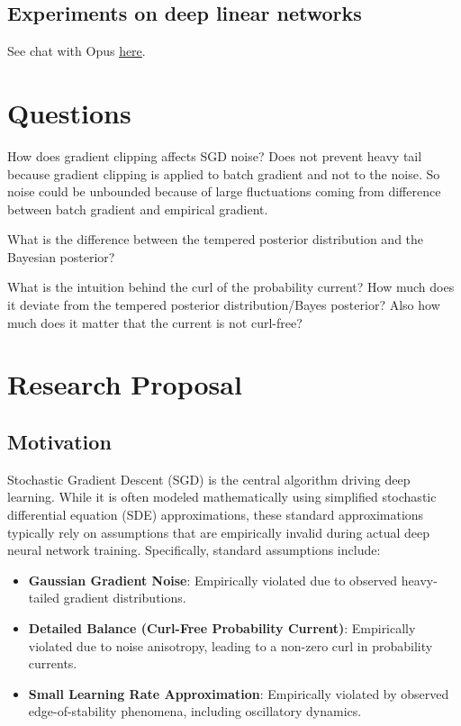\documentclass[11pt]{article}
\begin{document}
\subsection{Experiments on deep linear networks}
See chat with Opus \href{https://claude.ai/chat/ac289a72-d57a-4d4b-ad09-38f17425753c}{here}.
\section{Questions}
How does gradient clipping affects SGD noise? Does not prevent heavy tail because gradient clipping is applied to batch gradient and not to the noise. So noise could be unbounded because of large fluctuations coming from difference between batch gradient and empirical gradient.

What is the difference between the tempered posterior distribution and the Bayesian posterior?

What is the intuition behind the curl of the probability current? How much does it deviate from the tempered posterior distribution/Bayes posterior? Also how much does it matter that the current is not curl-free?
\section{Research Proposal}

\subsection{Motivation}

Stochastic Gradient Descent (SGD) is the central algorithm driving deep learning. While it is often modeled mathematically using simplified stochastic differential equation (SDE) approximations, these standard approximations typically rely on assumptions that are empirically invalid during actual deep neural network training. Specifically, standard assumptions include:

\begin{itemize}
\item \textbf{Gaussian Gradient Noise}: Empirically violated due to observed heavy-tailed gradient distributions.
\item \textbf{Detailed Balance (Curl-Free Probability Current)}: Empirically violated due to noise anisotropy, leading to a non-zero curl in probability currents.
\item \textbf{Small Learning Rate Approximation}: Empirically violated by observed edge-of-stability phenomena, including oscillatory dynamics.
\end{itemize}
\end{document}
